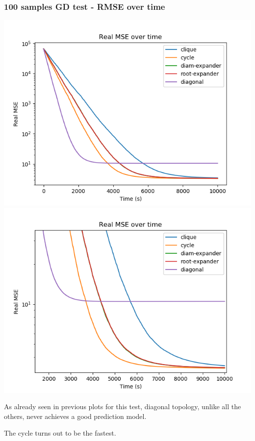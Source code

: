 \documentclass[11pt]{article}
\makeatletter
\def\maxwidth{\ifdim\Gin@nat@width>\linewidth\linewidth
    \else\Gin@nat@width\fi}
\let\Oldincludegraphics\includegraphics
\renewcommand{\includegraphics}[1]{\Oldincludegraphics[width=.8\maxwidth]{#1}}
\makeatother
\begin{document}
    \subsubsection{100 samples GD test - RMSE over
time}\label{samples-gd-test---rmse-over-time}

\includegraphics{media/img/tests/test_003_100samples_classic/3_real-mse_time.png}
\includegraphics{media/img/tests/test_003_100samples_classic/3_real-mse_time_zoom.png}

As already seen in previous plots for this test, diagonal topology,
unlike all the others, never achieves a good prediction model.

The cycle turns out to be the fastest.
\end{document}
